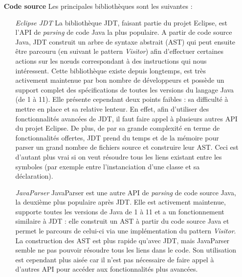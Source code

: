 \documentclass{scrartcl}
\begin{document}
\begin{itemize}
\begin{itemize}
            \end{itemize}
            \bigbreak
            \item[\textbf{Code source}] Les principales bibliothèques sont les suivantes :
            \begin{itemize}
                \smallbreak
            	\item[\textit{Eclipse JDT}]La bibliothèque JDT, faisant partie du projet Eclipse, est l'API de \emph{parsing} de code Java la plus populaire. A partir de code source Java, JDT construit un arbre de syntaxe abstrait (AST) qui peut ensuite être parcouru (en suivant le pattern \emph{Visitor}) afin d'effectuer certaines actions sur les nœuds correspondant à des instructions qui nous intéressent. Cette bibliothèque existe depuis longtemps, est très activement maintenue par bon nombre de développeurs et possède un support complet des spécifications de toutes les versions du langage Java (de 1 à 11). Elle présente cependant deux points faibles : sa difficulté à mettre en place et sa relative lenteur. En effet, afin d'utiliser des fonctionnalités avancées de JDT, il faut faire appel à plusieurs autres API du projet Eclipse. De plus, de par sa grande complexité en terme de fonctionnalités offertes, JDT prend du temps et de la mémoire pour parser un grand nombre de fichiers source et construire leur AST. Ceci est d'autant plus vrai si on veut résoudre tous les liens existant entre les symboles (par exemple entre l'instanciation d'une classe et sa déclaration).
            	
            	\smallbreak
            	\item[\textit{JavaParser}\footnotemark] JavaParser est une autre API de \emph{parsing} de code source Java, la deuxième plus populaire après JDT. Elle est activement maintenue, supporte toutes les versions de Java de 1 à 11 et a un fonctionnement similaire à JDT : elle construit un AST à partir du code source Java et permet le parcours de celui-ci via une implémentation du pattern \emph{Visitor}. La construction des AST est plus rapide qu'avec JDT, mais JavaParser semble ne pas pouvoir résoudre tous les liens dans le code. Son utilisation est cependant plus aisée car il n'est pas nécessaire de faire appel à d'autres API pour accéder aux fonctionnalités plus avancées.
            \end{itemize}
        \end{itemize}
        
\end{document}
